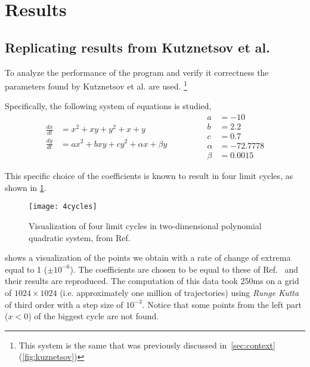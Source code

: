 
\section{Results}

\subsection{Replicating results from Kutznetsov et al.}

To analyze the performance of the program and verify it correctness the parameters found by Kutznetsov et al. \cite{kuznetsov_visualization_2013} are used. \footnote{This system is the same that was previously discussed in~\cref{sec:context} (\cref{fig:kuznetsov})}

Specifically, the following system of equations is studied,
\begin{equation}%
    \label{eq:kuznetsov}
    \begin{split}
        \frac{dx}{dt} &= x^2 + xy + y^2 + x + y\\
        \frac{dy}{dt} &= ax^2 + bxy + cy^2 + \alpha x + \beta y
    \end{split}
    \qquad \qquad
    \begin{split}
        a &= -10\\
        b &= 2.2\\
        c &= 0.7\\
        \alpha &= -72.7778\\
        \beta &= 0.0015
    \end{split}
\end{equation}

This specific choice of the coefficients is known to result in four limit
cycles, as shown in \cref{fig:kuznetsov2}.

\begin{figure}[H]
    \centering
    \texttt{[image: 4cycles]}
    \caption{Visualization of four limit cycles in two-dimensional polynomial quadratic system, from Ref.~\cite{kuznetsov_visualization_2013}
    }
    \label{fig:kuznetsov2}
\end{figure}

\pagebreak
{} shows a visualization of the points we obtain with a rate of change of extrema equal to 1 ($\pm 10^{-6}$). The coefficients are chosen to be equal to these of Ref.~\cite{kuznetsov_visualization_2013} and their results are reproduced. The computation of this data took 250ms on a grid of $1024 \times 1024$ (i.e. approximately one million of trajectories) using \emph{Runge Kutta} of third order with a step size of $10^{-3}$.
Notice that some points from the left part ($x < 0$) of the biggest cycle are not found.

